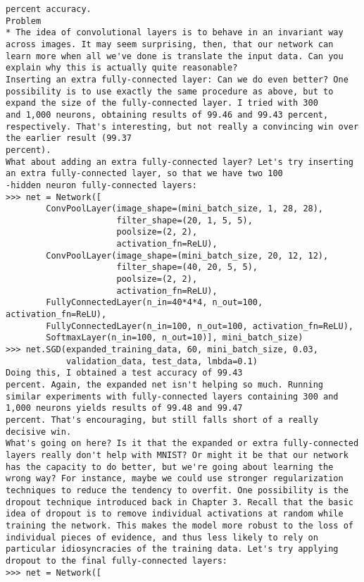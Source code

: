 \begin{lstlisting}
percent accuracy.
Problem
* The idea of convolutional layers is to behave in an invariant way across images. It may seem surprising, then, that our network can learn more when all we've done is translate the input data. Can you explain why this is actually quite reasonable? 
Inserting an extra fully-connected layer: Can we do even better? One possibility is to use exactly the same procedure as above, but to expand the size of the fully-connected layer. I tried with 300
and 1,000 neurons, obtaining results of 99.46 and 99.43 percent, respectively. That's interesting, but not really a convincing win over the earlier result (99.37
percent).
What about adding an extra fully-connected layer? Let's try inserting an extra fully-connected layer, so that we have two 100
-hidden neuron fully-connected layers: 
>>> net = Network([
        ConvPoolLayer(image_shape=(mini_batch_size, 1, 28, 28), 
                      filter_shape=(20, 1, 5, 5), 
                      poolsize=(2, 2), 
                      activation_fn=ReLU),
        ConvPoolLayer(image_shape=(mini_batch_size, 20, 12, 12), 
                      filter_shape=(40, 20, 5, 5), 
                      poolsize=(2, 2), 
                      activation_fn=ReLU),
        FullyConnectedLayer(n_in=40*4*4, n_out=100, activation_fn=ReLU),
        FullyConnectedLayer(n_in=100, n_out=100, activation_fn=ReLU),
        SoftmaxLayer(n_in=100, n_out=10)], mini_batch_size)
>>> net.SGD(expanded_training_data, 60, mini_batch_size, 0.03, 
            validation_data, test_data, lmbda=0.1)
Doing this, I obtained a test accuracy of 99.43
percent. Again, the expanded net isn't helping so much. Running similar experiments with fully-connected layers containing 300 and 1,000 neurons yields results of 99.48 and 99.47
percent. That's encouraging, but still falls short of a really decisive win.
What's going on here? Is it that the expanded or extra fully-connected layers really don't help with MNIST? Or might it be that our network has the capacity to do better, but we're going about learning the wrong way? For instance, maybe we could use stronger regularization techniques to reduce the tendency to overfit. One possibility is the dropout technique introduced back in Chapter 3. Recall that the basic idea of dropout is to remove individual activations at random while training the network. This makes the model more robust to the loss of individual pieces of evidence, and thus less likely to rely on particular idiosyncracies of the training data. Let's try applying dropout to the final fully-connected layers:
>>> net = Network([

\end{lstlisting}
